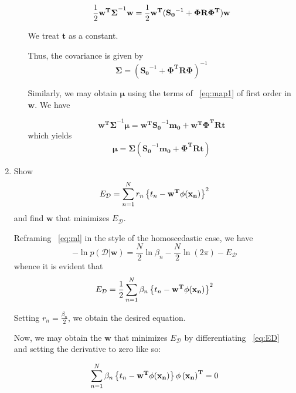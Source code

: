 \documentclass[reqno]{amsart}
\begin{document}
\begin{enumerate}[label=\textbf{(\Roman*)}]
\begin{enumerate}[label=\textbf{(\alph*)}]
                \[\frac{1}{2} \mathbf{w^T \Sigma}^{-1}\mathbf{w} = \frac{1}{2} \mathbf{w^T}(\mathbf{S_0}^{-1} + \mathbf{\Phi R \Phi^T})\mathbf{w} \]

                We treat \(\mathbf{t}\) as a constant.

                Thus, the covariance is given by \[\mathbf{\Sigma} = (\mathbf{S_0}^{-1} + \mathbf{\Phi^T R \Phi})^{-1}\]


                Similarly, we may obtain \(\boldsymbol{\mu}\) using the terms of ~\ref{eq:map1} of first order in \(\mathbf{w}\). We have

                \[\mathbf{w^T \Sigma}^{-1} \boldsymbol{\mu} = \mathbf{w^T} \mathbf{S_0}^{-1} \mathbf{m_0} + \mathbf{w^T \Phi^T R t}\]
                    which yields
                \[\boldsymbol{\mu} = \boldsymbol{\Sigma} (\mathbf{S_0}^{-1} \mathbf{m_0} + \mathbf{\Phi^T R t})\]

                
        \end{enumerate}

        

        \item Show \[E_\mathcal{D} = \sum_{n = 1}^{N} r_n \left\{t_n - \mathbf{w^T \phi(x_n)}\right\}^2 \] and find \(\mathbf{w}\) that minimizes \(E_\mathcal{D}\).
        
        Reframing ~\ref{eq:ml} in the style of the homoscedastic case, we have \[-\ln p(\mathcal{D} | \mathbf{w}) = \frac{N}{2} \ln \beta_n - \frac{N}{2} \ln (2\pi) - E_\mathcal{D}\] whence it is evident that \[E_\mathcal{D} = \frac{1}{2} \sum_{n = 1}^{N} \beta_n \left\{t_n - \mathbf{w^T \phi(x_n)}\right\}^2 \label{eq:ED} \]

        Setting \(r_n = \frac{\beta_n}{2}\), we obtain the desired equation.

        Now, we may obtain the \(\mathbf{w}\) that minimizes \(E_\mathcal{D}\) by differentiating ~\ref{eq:ED} and setting the derivative to zero like so:

        \[\sum_{n = 1}^{N} \beta_n \left\{t_n - \mathbf{w^T \phi(x_n)}\right\} \mathbf{\phi\left(x_n\right)^T} = 0\]


\end{enumerate}
\end{document}
